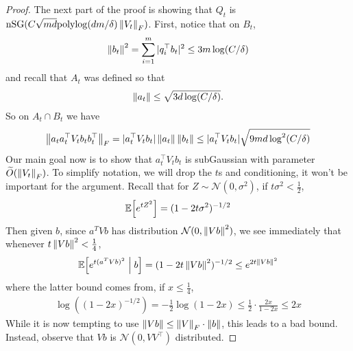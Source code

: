\begin{proof}
The next part of the proof is showing that $Q_t$ is $\mathrm{nSG}(C\sqrt{md} \mathrm{polylog}(dm/\delta) \left\lVert V_t \right\rVert_F)$. First, notice that on $B_t$,
\begin{align*}
    \left\lVert b_t \right\rVert^2 = \sum_{i=1}^m |q_i^\top b_t|^2 \leq 3m \log(C/\delta)
\end{align*}
and recall that $A_t$ was defined so that
\begin{align*}
    \left\lVert a_t \right\rVert \leq \sqrt{3d \log(C/\delta)}.
\end{align*}
So on $A_t \cap B_t$ we have
\begin{align*}
    \left\lVert a_t a_t^\top V_t b_t b_t^\top \right\rVert_F = |a_t^\top V_t b_t| \left\lVert a_t \right\rVert \left\lVert b_t \right\rVert \leq |a_t^\top V_t b_t| \sqrt{9md \log^2(C/\delta)}
\end{align*}
Our main goal now is to show that $a_t^\top V_t b_t$ is subGaussian with parameter $\widetilde{O}(\left\lVert V_t \right\rVert_F)$. To simplify notation, we will drop the $t$s and conditioning, it won't be important for the argument. 
Recall that for $Z \sim \mathcal N(0, \sigma^2)$, if $t\sigma^2 < \frac 12$,
\begin{align*}
    \mathbb{E}\qty[e^{t Z^2}] = (1-2t\sigma ^2)^{-1/2}
\end{align*}
Then given $b$, since $a^T V b$ has distribution $\mathcal N(0, \left\lVert Vb \right\rVert^2)$, we see immediately that whenever $t \left\lVert Vb \right\rVert^2 < \frac 14$,
\begin{align*}
    \mathbb{E}\qty[e^{t(a^T V b)^2} \;\middle|\; b] = (1-2t \left\lVert Vb \right\rVert^2)^{-1/2} \leq e^{2t \left\lVert Vb \right\rVert^2}
\end{align*}
where the latter bound comes from, if $x \leq \frac 14$,
\begin{align*}
    \log((1-2x)^{-1/2}) = -\frac 12 \log(1-2x) \leq \frac 12 \cdot  \frac{2x}{1-2x} \leq 2x
\end{align*}
While it is now tempting to use $\left\lVert Vb \right\rVert \leq \left\lVert V \right\rVert_F \cdot \left\lVert b \right\rVert$, this leads to a bad bound. Instead, observe that $Vb$ is $\mathcal N(0, VV^\top)$ distributed. 


\end{proof}
